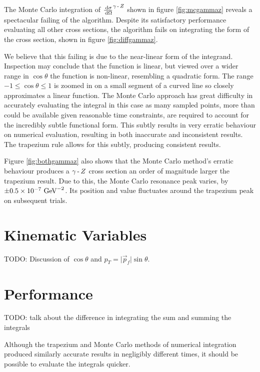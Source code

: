 \documentclass[]{article}
\providecommand{\e}[1]{\ensuremath{\times 10^{#1}}}
\begin{document}
The Monte Carlo integration of $\frac{\,\operatorname{d}\!{\sigma}}{\,\operatorname{d}\!{\Omega}}^{\gamma\operatorname{-}Z }$ shown in figure \ref{fig:mcgammaz} reveals a spectacular failing of the algorithm. Despite its satisfactory performance evaluating all other cross sections, the algorithm fails on integrating the form of the cross section, shown in figure \ref{fig:diffgammaz}.

We believe that this failing is due to the near-linear form of the integrand. Inspection may conclude that the function is linear, but viewed over a wider range in $\cos{\theta}$ the function is non-linear, resembling a quadratic form. The range $-1\leq\cos{\theta}\leq1$ is zoomed in on a small segment of a curved line so closely approximates a linear function. The Monte Carlo approach has great difficulty in accurately evaluating the integral in this case as many sampled points, more than could be available given reasonable time constraints, are required to account for the incredibly subtle functional form. This subtly results in very erratic behaviour on numerical evaluation, resulting in both inaccurate and inconsistent results. The trapezium rule allows for this subtly, producing consistent results.

Figure \ref{fig:bothgammaz} also shows that the Monte Carlo method's erratic behaviour produces a $\gamma\operatorname{-}Z $ cross section an order of magnitude larger the trapezium result. Due to this, the Monte Carlo resonance peak varies, by $\pm0.5\e{-7}\GeV^{-2}$. Its position and value fluctuates around the trapezium peak on subsequent trials.




\section{Kinematic Variables}\label{sec:variables}

TODO: Discussion of $\cos{\theta}$ and $p_{T} = \lvert\vec{p}_{f}\rvert\sin{\theta}$.


\section{Performance}\label{sec:performance}

TODO: talk about the difference in integrating the sum and summing the integrals

Although the trapezium and Monte Carlo methods of numerical integration produced similarly accurate results in negligibly different times, it should be possible to evaluate the integrals quicker.
\end{document}
